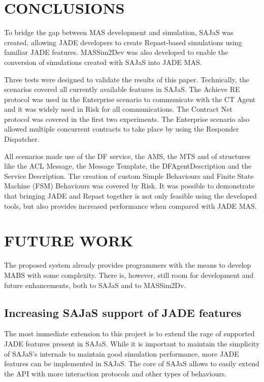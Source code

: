 \documentclass[a4paper,twoside]{article}
\begin{document}


\section{\uppercase{Conclusions}}
\label{sec:conclusion}

\noindent To bridge the gap between MAS development and simulation, SAJaS was created, allowing JADE developers to create Repast-based simulations using familiar JADE features. MASSim2Dev was also developed to enable the conversion of simulations created with SAJaS into JADE MAS.

Three tests were designed to validate the results of this paper. Technically, the scenarios covered all currently available features in SAJaS. The Achieve RE protocol was used in the Enterprise scenario to communicate with the CT Agent and it was widely used in Risk for all communications. The Contract Net protocol was covered in the first two experiments. The Enterprise scenario also allowed multiple concurrent contracts to take place by using the Responder Dispatcher.

All scenarios made use of the DF service, the AMS, the MTS and of structures like the ACL Message, the Message Template, the DFAgentDescription and the Service Description. The creation of custom Simple Behaviours and Finite State Machine (FSM) Behaviours was covered by Risk. It was possible to demonstrate that bringing JADE and Repast together is not only feasible using the developed tools, but also provides increased performance when compared with JADE MAS.

\section{\uppercase{Future Work}}
\label{sec:futurework}

The proposed system already provides programmers with the means to develop MABS with some complexity. There is, however, still room for development and future enhancements, both to SAJaS and to MASSim2Dv.

\subsection{Increasing SAJaS support of JADE features}
The most immediate extension to this project is to extend the rage of supported JADE features present in SAJaS. While it is important to maintain the simplicity of SAJaS's internals to maintain good simulation performance, more JADE features can be implemented in SAJaS. The core of SAJaS allows to easily extend the API with more interaction protocols and other types of behaviours.
\end{document}
